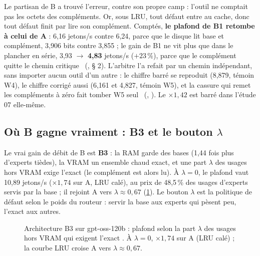 Le partisan de B a trouvé l'erreur, contre son propre camp : l'outil ne comptait pas les octets des compléments. Or, sous LRU, tout défaut entre au cache, donc tout défaut finit par lire son complément. Comptés, \textbf{le plafond de B1 retombe à celui de A} : 6,16 jetons/s contre 6,24, parce que le disque lit base et complément, 3,906 bits contre 3,855 ; le gain de B1 ne vit plus que dans le plancher en série, 3,93 $\to$ \textbf{4,83} jetons/s ($+23\,\%$), parce que le complément quitte le chemin critique \calc~(, § 2). L'arbitre l'a refait par un chemin indépendant, sans importer aucun outil d'un autre : le chiffre barré se reproduit (8,879, témoin W4), le chiffre corrigé aussi (6,161 et 4,827, témoin W5), et la cassure qui remet les compléments à zéro fait tomber W5 seul \calc~(, ). Le $\times 1{,}42$ est barré dans l'étude 07 elle-même.

\subsection{Où B gagne vraiment : B3 et le bouton \texorpdfstring{$\lambda$}{λ}}

Le vrai gain de débit de B est \textbf{B3} : la RAM garde des bases (1,44 fois plus d'experts tièdes), la VRAM un ensemble chaud exact, et une part $\lambda$ des usages hors VRAM exige l'exact (le complément est alors lu). À $\lambda = 0$, le plafond vaut 10,89 jetons/s ($\times 1{,}74$ sur A, LRU calé), au prix de 48,5\,\% des usages d'experts servis par la base ; il rejoint A vers $\lambda \approx 0{,}67$ (\cref{fig:b3-lambda}). Le bouton $\lambda$ est la politique de défaut selon le poids du routeur : servir la base aux experts qui pèsent peu, l'exact aux autres.

\begin{figure}[ht]
\centering
\GrapheBtroisLambda
\caption[B3 : le débit contre l'exactitude]{Architecture B3 sur gpt-oss-120b : plafond selon la part $\lambda$ des usages hors VRAM qui exigent l'exact \calc. À $\lambda = 0$, $\times 1{,}74$ sur A (LRU calé) ; la courbe LRU croise A vers $\lambda \approx 0{,}67$.}
\label{fig:b3-lambda}
\end{figure}

